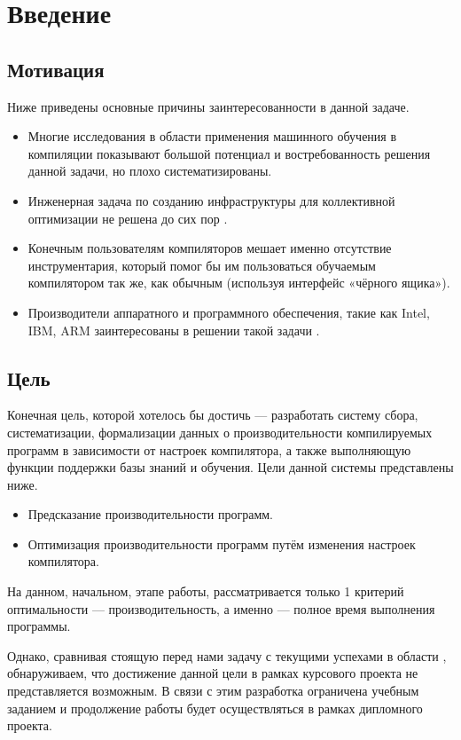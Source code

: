 \section{Введение}
\subsection{Мотивация}
Ниже приведены основные причины заинтересованности в данной задаче.
\begin{itemize}
    \item Многие исследования в области применения машинного обучения в компиляции \cite{Dubach2009PCO,Thomson2009RTT,Stephenson2003MOI} показывают большой потенциал и востребованность решения данной задачи, но плохо систематизированы.
    \item Инженерная задача по созданию инфраструктуры для коллективной оптимизации не решена до сих пор \cite{Fursin2010COP}.
    \item Конечным пользователям компиляторов мешает именно отсутствие инструментария, который помог бы им пользоваться обучаемым компилятором так же, как обычным (используя интерфейс «чёрного ящика»).
    \item Производители аппаратного и программного обеспечения, такие как Intel, IBM, ARM заинтересованы в решении такой задачи \cite{IntelExascale}.
\end{itemize}


\subsection{Цель}
Конечная цель, которой хотелось бы достичь --- разработать систему сбора, систематизации, формализации данных о производительности компилируемых программ в зависимости от настроек компилятора, а также выполняющую функции поддержки базы знаний и обучения. Цели данной системы представлены ниже.
\begin{itemize}
    \item Предсказание производительности программ.
    \item Оптимизация производительности программ путём изменения настроек компилятора.
\end{itemize}

На данном, начальном, этапе работы, рассматривается только 1 критерий оптимальности --- производительность, а именно --- полное время выполнения программы.

Однако, сравнивая стоящую перед нами задачу с текущими успехами в области \cite{Fursin2010COP}, обнаруживаем, что достижение данной цели в рамках курсового проекта не представляется возможным. В связи с этим разработка ограничена учебным заданием и продолжение работы будет осуществляться в рамках дипломного проекта.

